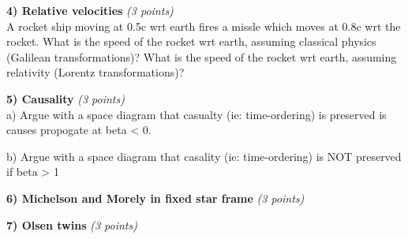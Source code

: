 {\clearpage

\textbf{4) Relative velocities }\hfill \textit{(3 points)}\\

A rocket ship moving at 0.5c wrt earth fires a missle which moves at 0.8c wrt the rocket.
What is the speed of the rocket wrt earth, assuming classical physics (Galilean transformations)?
What is the speed of the rocket wrt earth, assuming relativity (Lorentz transformations)?

\vspace{3in}

\textbf{5) Causality}  \hfill \textit{(3 points)}\\
a) Argue with a space diagram that casualty (ie: time-ordering) is preserved 
is causes propogate at beta < 0. 

\vspace{2in}
b) Argue with a space diagram that casality (ie: time-ordering) is NOT preserved 
if beta > 1
\vspace{2in}

\textbf{6) Michelson and Morely in fixed star frame}  \hfill \textit{(3 points)}\\

\clearpage

\textbf{7) Olsen twins}  \hfill \textit{(3 points)}\\



} %

